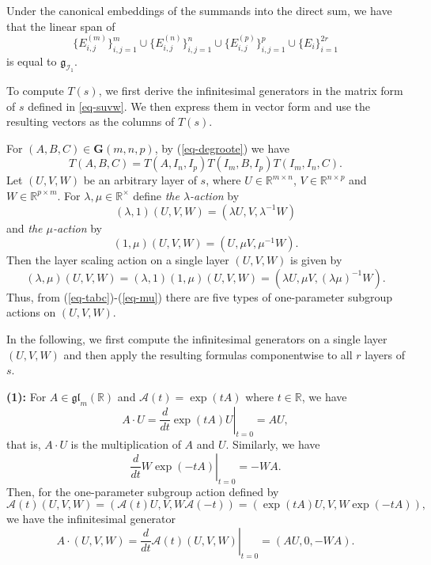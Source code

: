 \documentclass[reqno]{amsart}
\theoremstyle{definition}
\numberwithin{equation}{section}
\theoremstyle{remark}
\begin{document}
Under the canonical embeddings of the summands into the direct sum, we have that the linear span of 
$$\{E_{i,j}^{(m)}\}_{i,j=1}^m\cup\{E_{i,j}^{(n)}\}_{i,j=1}^n\cup
\{E_{i,j}^{(p)}\}_{i,j=1}^p\cup\{E_i\}_{i=1}^{2r}$$
is equal to $\mathfrak{g}_{\mathcal{I}_1}$.

To compute $T(s)$, we first derive the infinitesimal generators in
the matrix form of $s$ defined in \eqref{eq-suvw}. We then express
them in vector form and use the resulting vectors as the columns of
$T(s)$.

For $(A,B,C)\in \mathbf{G}(m,n,p)$, by (\ref{eq-degroote}) we have
\begin{equation}\label{eq-tabc}
T(A,B,C)=T(A,I_n,I_p)T(I_m,B,I_p) T(I_m,I_n,C).
\end{equation}
Let $(U,V,W)$ be an arbitrary layer of $s$, where $U\in \mathbb{R}^{m\times n}$, $V\in \mathbb{R}^{n\times p}$ and $W\in \mathbb{R}^{p\times m}$.
For $\lambda,\mu\in \mathbb{R}^{\times}$ define \emph{the $\lambda$-action} by 
\begin{equation}\label{eq-lamb}
(\lambda,1)(U, V, W)=(\lambda U, V, \lambda^{-1}W)
\end{equation}
and \emph{the $\mu$-action} by
\begin{equation}\label{eq-mu}
(1,\mu)(U, V, W)=( U, \mu V, \mu^{-1}W).
\end{equation}
Then the layer scaling action on a single layer $(U, V, W)$ is given by
$$(\lambda,\mu)(U, V, W)=(\lambda,1)(1,\mu)(U, V, W)=(\lambda U, \mu V, (\lambda\mu)^{-1}W).$$
Thus, from (\ref{eq-tabc})-(\ref{eq-mu}) there are five types of one-parameter subgroup actions on $(U,V,W)$. 

In the following, we first compute the infinitesimal generators on
a single layer $(U,V,W)$ and then apply the resulting formulas
componentwise to all $r$ layers of $s$.

\textbf{(1):} For $A \in \mathfrak{gl}_m(\mathbb{R})$ and $\mathcal{A}(t)=\exp(tA)$ where $t\in \mathbb{R}$, we have 
\begin{equation*}
A\cdot U =\left.\frac{d}{dt}\exp(tA)U\right|_{t=0}=AU,
\end{equation*}
that is, $A\cdot U$ is the multiplication of $A$ and $U$.
Similarly, we have
$$\left.\frac{d}{dt}W\exp(-tA)\right|_{t=0}=-WA.$$
Then, for the one-parameter subgroup action defined by
\begin{equation*}
\mathcal{A}(t) (U,V,W) = (\mathcal{A}(t)U, V, W\mathcal{A}(-t))=\left(\exp(t A)U,V,W\exp(-t A)\right),
\end{equation*}
we have the infinitesimal generator
\begin{equation}\label{eq-infslocauvw}
A\cdot(U,V,W)=\left.\frac{d}{dt}\mathcal{A}(t)(U,V,W)\right|_{t=0}=(AU, 0,
-WA).
\end{equation}
\end{document}
